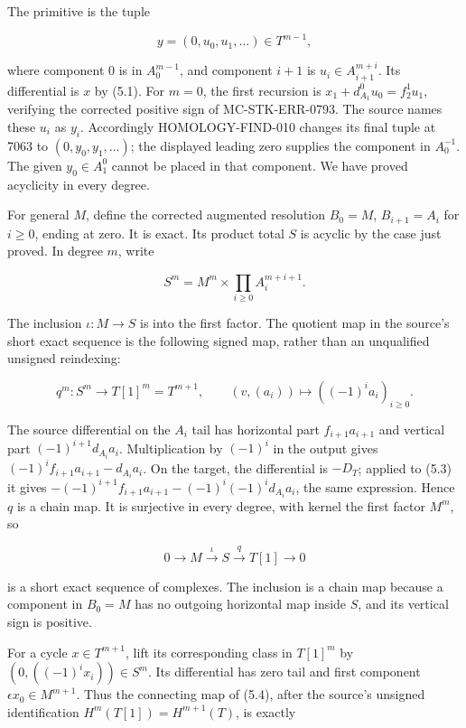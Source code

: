 \documentclass[11pt]{article}
\begin{document}
The primitive is the tuple

\[
y=(0,u_0,u_1,\ldots)\in T^{m-1},             \tag{5.2}
\]

where component 0 is in \(A_0^{m-1}\), and component \(i+1\) is \(u_i\in A_{i+1}^{m+i}\). Its differential is \(x\) by (5.1). For \(m=0\), the first recursion is \(x_1+d_{A_1}^0u_0=f_2^1u_1\), verifying the corrected positive sign of MC-STK-ERR-0793. The source names these \(u_i\) as \(y_i\). Accordingly HOMOLOGY-FIND-010 changes its final tuple at 7063 to \((0,y_0,y_1,\ldots)\); the displayed leading zero supplies the component in \(A_0^{-1}\). The given \(y_0\in A_1^0\) cannot be placed in that component. We have proved acyclicity in every degree.

For general \(M\), define the corrected augmented resolution \(B_0=M\), \(B_{i+1}=A_i\) for \(i\geq0\), ending at zero. It is exact. Its product total \(S\) is acyclic by the case just proved. In degree \(m\), write

\[
S^m=M^m\times\prod_{i\geq0}A_i^{m+i+1}.
\]

The inclusion \(\iota:M\to S\) is into the first factor. The quotient map in the source's short exact sequence is the following signed map, rather than an unqualified unsigned reindexing:

\[
q^m:S^m\longrightarrow T[1]^m=T^{m+1},\qquad
(v,(a_i))\longmapsto((-1)^ia_i)_{i\geq0}.       \tag{5.3}
\]

The source differential on the \(A_i\) tail has horizontal part \(f_{i+1}a_{i+1}\) and vertical part \((-1)^{i+1}d_{A_i}a_i\). Multiplication by \((-1)^i\) in the output gives \((-1)^if_{i+1}a_{i+1}-d_{A_i}a_i\). On the target, the differential is \(-D_T\); applied to (5.3) it gives \(-(-1)^{i+1}f_{i+1}a_{i+1}-(-1)^i(-1)^id_{A_i}a_i\), the same expression. Hence \(q\) is a chain map. It is surjective in every degree, with kernel the first factor \(M^m\), so

\[
0\longrightarrow M\xrightarrow{\iota}S\xrightarrow{q}T[1]
\longrightarrow0                                      \tag{5.4}
\]

is a short exact sequence of complexes. The inclusion is a chain map because a component in \(B_0=M\) has no outgoing horizontal map inside \(S\), and its vertical sign is positive.

For a cycle \(x\in T^{m+1}\), lift its corresponding class in \(T[1]^m\) by \((0,((-1)^ix_i))\in S^m\). Its differential has zero tail and first component \(\epsilon x_0\in M^{m+1}\). Thus the connecting map of (5.4), after the source's unsigned identification \(H^m(T[1])=H^{m+1}(T)\), is exactly
\end{document}
